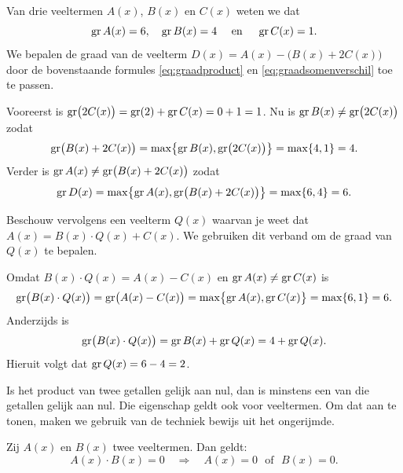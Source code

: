 \documentclass{ximera}
\begin{document}
\begin{example} 
Van drie veeltermen $A(x)$, $B(x)$ en $C(x)$ weten we dat
\[
\operatorname{gr} A(x) = 6, \quad \operatorname{gr} B(x) = 4 \quad \text{ en } \quad \operatorname{gr} C(x) = 1.
\]
We bepalen de graad van de veelterm $D(x) = A(x) - \bigl(B(x) + 2C(x)\bigr)$ door de bovenstaande formules \eqref{eq:graadproduct} en \eqref{eq:graadsomenverschil} toe te passen. 

Vooreerst is $\operatorname{gr}\bigl(2C(x)\bigr) = \operatorname{gr}(2) + \operatorname{gr} C(x) = 0 + 1 = 1$. Nu is $\operatorname{gr} B(x) \neq \operatorname{gr}\bigl(2C(x)\bigr)$ zodat
\[
\operatorname{gr} \bigl(B(x) + 2C(x)\bigr) = \max \bigl\{\operatorname{gr} B(x),\operatorname{gr}\bigl(2C(x)\bigr)\bigr\} = \max\{4,1\} = 4.
\]
Verder is $\operatorname{gr} A(x) \neq \operatorname{gr}\bigl(B(x) + 2C(x)\bigr)$ zodat 
\[
\operatorname{gr} D(x) = \max \bigl\{\operatorname{gr} A(x),\operatorname{gr}\bigl(B(x) + 2C(x)\bigr)\bigr\} = \max\{6,4\} = 6.
\]

Beschouw vervolgens een veelterm $Q(x)$ waarvan je weet dat $A(x) = B(x)\cdot Q(x) + C(x)$. We gebruiken dit verband om de graad van $Q(x)$ te bepalen. 

Omdat $B(x)\cdot Q(x) = A(x) - C(x)$ en $\operatorname{gr} A(x) \neq \operatorname{gr} C(x)$ is
\[
\operatorname{gr}\bigl(B(x)\cdot Q(x)\bigr) = \operatorname{gr}\bigl(A(x) - C(x)\bigr) = \max \bigl\{\operatorname{gr} A(x),\operatorname{gr} C(x)\bigr\} = \max\{6,1\} = 6.
\]
Anderzijds is 
\[
\operatorname{gr}\bigl(B(x)\cdot Q(x)\bigr) = \operatorname{gr} B(x) + \operatorname{gr} Q(x) = 4 + \operatorname{gr} Q(x).
\]
Hieruit volgt dat $\operatorname{gr} Q(x) = 6-4 = 2$. 
\end{example} 

Is het product van twee getallen gelijk aan nul, dan is minstens een van die getallen gelijk aan nul. Die eigenschap geldt ook voor veeltermen. Om dat aan te tonen, maken we gebruik van de techniek bewijs uit het ongerijmde. 
 
\begin{proposition} 
Zij $A(x)$ en $B(x)$ twee veeltermen. Dan geldt: 
\[
A(x)\cdot B(x) = 0 \quad \Rightarrow \quad A(x) = 0 \,\,\text{ of } \,\, B(x) = 0.
\]
\end{proposition} 
\end{document}
